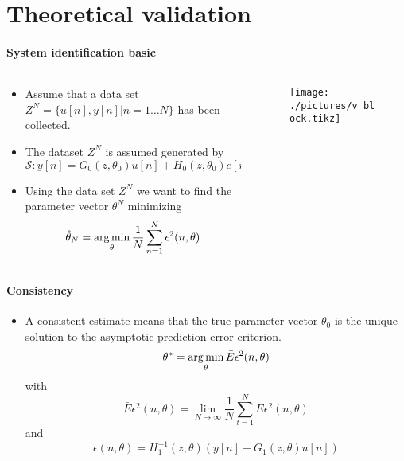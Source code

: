 \section{Theoretical validation}
\begin{frame}{\secname}
	\framesubtitle{System identification basic}
	\begin{columns}
		\begin{column}{0.5\textwidth}
			\begin{itemize}
				\item Assume that a data set $Z^N = \{u[n],y[n]|n=1\ldots N\}$ has been collected.
				\item The dataset $Z^N$ is assumed generated by
					\begin{equation}
						\mathcal{S}: y[n] = G_0(z,\theta_0)u[n] + H_0(z,\theta_0)e[n]
					\end{equation}
				\item Using the data set $Z^N$ we want to find the parameter vector $\theta^N$ minimizing
\begin{equation}\label{eq:pred}
		\hat{\theta}_N = \operatorname*{arg\,min}_{\theta} \frac{1}{N}\sum_{n=1}^N \epsilon^2(n,\theta)
\end{equation}
			\end{itemize}
		\end{column}
		\begin{column}{0.5\textwidth}
			\begin{figure}
				\texttt{[image: ./pictures/v\_block.tikz]}
			\end{figure}
		\end{column}
	\end{columns}
\end{frame}
\begin{frame}{\secname}
	\framesubtitle{Consistency}
	\begin{itemize}
	\item A consistent estimate means that the true parameter vector $\theta_0$ is the unique solution to the asymptotic prediction error criterion.
\begin{equation}\label{eq:theta_1}
		\theta^*= \operatorname*{arg\,min}_{\theta} \bar{E}\epsilon^2(n,\theta)
\end{equation}
with
\begin{equation}
		\bar{E}\epsilon^2(n,\theta) = \lim_{N\to\infty}\frac{1}{N}\sum_{t=1}^N E\epsilon^2(n,\theta)
\end{equation}
and
\begin{equation}\label{eq:epsi}
		\epsilon(n,\theta)=H_1^{-1}(z,\theta)(y[n]-G_1(z,\theta)u[n])
\end{equation}
\end{itemize}
\end{frame}
